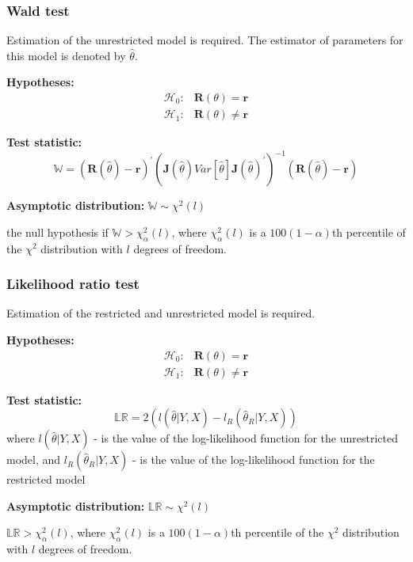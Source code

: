 \documentclass[notes,blackandwhite,mathsans]{beamer}
\begin{document}
\begin{frame}
\frametitle{Wald test}
\small
{\color{mcxs3}Estimation of the unrestricted model is required. The estimator of parameters for this model is denoted by} $\hat\theta$.

\vspace{0.3cm}\textbf{Hypotheses:}
\begin{align*}
\mathcal{H}_0: & \mathbf{R}(\theta) = \mathbf{r}\\
\mathcal{H}_1: & \mathbf{R}(\theta) \neq \mathbf{r}
\end{align*}

\textbf{Test statistic:}
$$ \mathbb{W} = \left( \mathbf{R}(\hat\theta) - \mathbf{r} \right)^{'}\left(\mathbf{J}(\hat\theta)Var[\hat\theta]\mathbf{J}(\hat\theta)^{'}\right)^{-1}\left( \mathbf{R}(\hat\theta) - \mathbf{r} \right) $$

\vspace{0.3cm}\textbf{Asymptotic distribution:} $\mathbb{W}\sim\chi^2(l)$

 {\color{mcxs3}the null hypothesis if} $\mathbb{W}>\chi^2_{\alpha}(l)$, {\color{mcxs3}where} $\chi^2_{\alpha}(l)$ {\color{mcxs3}is a} $100(1-\alpha)$th {\color{mcxs3}percentile of the} $\chi^2$ {\color{mcxs3}distribution with} $l$ {\color{mcxs3}degrees of freedom.}

\end{frame}





\begin{frame}
\frametitle{Likelihood ratio test}
\small
{\color{mcxs3}Estimation of the restricted and unrestricted model is required.}

\vspace{0.3cm}\textbf{Hypotheses:}
\begin{align*}
\mathcal{H}_0: & \mathbf{R}(\theta) = \mathbf{r}\\
\mathcal{H}_1: & \mathbf{R}(\theta) \neq \mathbf{r}
\end{align*}

\textbf{Test statistic:}
$$ \mathbb{LR} = 2\left( l(\hat{\theta}|Y,X) - l_R(\hat\theta_R|Y,X)\right) $$
{\color{mcxs3}where} $l(\hat{\theta}|Y,X)$ {\color{mcxs3}- is the value of the log-likelihood function for the} {\color{mcxs2}unrestricted model}, {\color{mcxs3}and} $l_R(\hat\theta_R|Y,X)$ {\color{mcxs3}- is the value of the log-likelihood function for the {\color{mcxs2}restricted model}}

\vspace{0.3cm}\textbf{Asymptotic distribution:} $\mathbb{LR}\sim\chi^2(l)$

 $\mathbb{LR}>\chi^2_{\alpha}(l)${\color{mcxs3}, where} $\chi^2_{\alpha}(l)$ {\color{mcxs3}is a} $100(1-\alpha)$th {\color{mcxs3}percentile of the} $\chi^2$ {\color{mcxs3}distribution with $l$ degrees of freedom.}

\end{frame}
\end{document}
